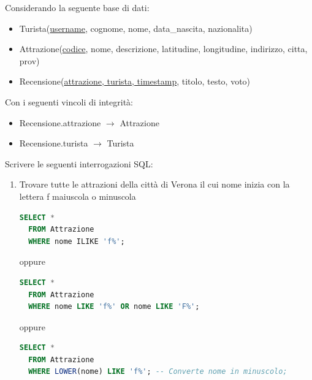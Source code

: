 \documentclass[a4paper,twoside]{article}
\begin{document}
\begin{exercise}
  Considerando la seguente base di dati:
  \begin{itemize}
    \item Turista(\underline{username}, cognome, nome, data\_nascita, nazionalita)

    \item Attrazione(\underline{codice}, nome, descrizione, latitudine, longitudine,
      indirizzo, citta, prov)

    \item Recensione(\underline{attrazione, turista, timestamp}, titolo, testo, voto)
  \end{itemize}
  \noindent
  Con i seguenti vincoli di integrità:
  \begin{itemize}
    \item Recensione.attrazione $\to$ Attrazione
    \item Recensione.turista $\to$ Turista
  \end{itemize}
  \noindent
  Scrivere le seguenti interrogazioni SQL:
  \begin{enumerate}
    \item Trovare tutte le attrazioni della città di Verona il cui nome inizia con la
      lettera f maiuscola o minuscola
\begin{lstlisting}[language=SQL]
SELECT *
  FROM Attrazione
  WHERE nome ILIKE 'f%';
\end{lstlisting}
      oppure
\begin{lstlisting}[language=SQL]
SELECT *
  FROM Attrazione
  WHERE nome LIKE 'f%' OR nome LIKE 'F%';
\end{lstlisting}
      oppure
\begin{lstlisting}[language=SQL]
SELECT *
  FROM Attrazione
  WHERE LOWER(nome) LIKE 'f%'; -- Converte nome in minuscolo;
\end{lstlisting}



\end{enumerate}
\end{exercise}
\end{document}
